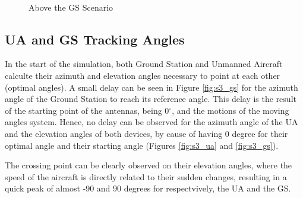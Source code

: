 \begin{figure}[H]
	\\
	\caption{Above the GS Scenario}
	\label{fig:s3_map}
\end{figure}

\subsection*{UA and GS Tracking Angles}
In the start of the simulation, both Ground Station and Unmanned Aircraft calculte their azimuth and elevation angles necessary to point at each other (optimal angles). A small delay can be seen in Figure \ref{fig:s3_gs} for the azimuth angle of the Ground Station to reach its reference angle. This delay is the result of the starting point of the antennas, being 0$^{\circ}$, and the motions of the moving angles system. Hence, no delay can be observed for the azimuth angle of the UA and the elevation angles of both devices, by cause of having 0 degree for their optimal angle and their starting angle (Figures \ref{fig:s3_ua} and \ref{fig:s3_gs}).

The crossing point can be clearly observed on their elevation angles, where the speed of the aircraft is directly related to their sudden changes, resulting in a quick peak of almost -90 and 90 degrees for respectvively, the UA and the GS. 

